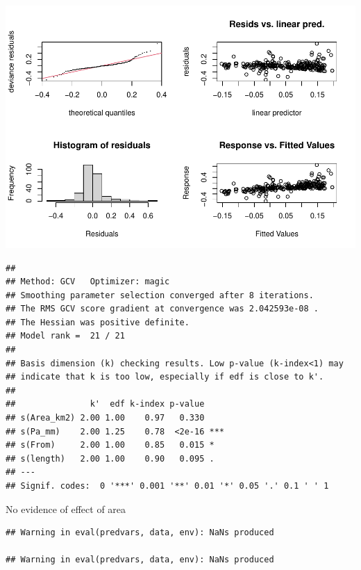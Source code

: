\documentclass[]{elsarticle} %
\begin{document}
\includegraphics{Forest_and_Water_files/figure-latex/model2c-1.pdf}

\begin{verbatim}
## 
## Method: GCV   Optimizer: magic
## Smoothing parameter selection converged after 8 iterations.
## The RMS GCV score gradient at convergence was 2.042593e-08 .
## The Hessian was positive definite.
## Model rank =  21 / 21 
## 
## Basis dimension (k) checking results. Low p-value (k-index<1) may
## indicate that k is too low, especially if edf is close to k'.
## 
##               k'  edf k-index p-value    
## s(Area_km2) 2.00 1.00    0.97   0.330    
## s(Pa_mm)    2.00 1.25    0.78  <2e-16 ***
## s(From)     2.00 1.00    0.85   0.015 *  
## s(length)   2.00 1.00    0.90   0.095 .  
## ---
## Signif. codes:  0 '***' 0.001 '**' 0.01 '*' 0.05 '.' 0.1 ' ' 1
\end{verbatim}

No evidence of effect of area

\begin{verbatim}
## Warning in eval(predvars, data, env): NaNs produced

## Warning in eval(predvars, data, env): NaNs produced
\end{verbatim}
\end{document}
